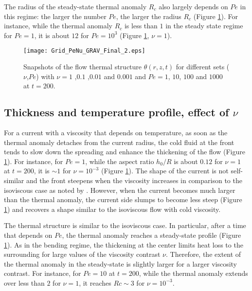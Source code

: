 The  radius of  the steady-state  thermal anomaly  $R_c$ also  largely
depends on $Pe$ in this regime: the larger the number $Pe$, the larger
the  radius  $R_c$  (Figure \ref{C3-Grid_PeNu_GRAV}).   For  instance,
while the thermal  anomaly $R_c$ is less than $1$  in the steady state
regime  for   $Pe=1$,  it   is  about   $12$  for   $Pe=10^3$  (Figure
\ref{C3-Grid_PeNu_GRAV}, $\nu=1$).

\begin{figure}[h!]
  \begin{center}
    \graphicspath{ {/Users/thorey/Documents/These/Projet/Refroidissement/Skin_Model/Figure/JFM_V13/} }
    \texttt{[image: Grid\_PeNu\_GRAV\_Final\_2.eps]}
    \caption{Snapshots of  the flow thermal  structure $\theta(r,z,t)$
      for different sets ($\nu$,$Pe$) with $\nu= 1$ ,$0.1$ ,$0.01$ and
      $0.001$ and $Pe=1$, $10$, $100$ and $1000$ at $t=200$.}
    \label{C3-Grid_PeNu_GRAV}
  \end{center}
\end{figure}

\subsection{Thickness and temperature profile, effect of $\nu$}
\label{C3-sec:thickn-temp-prof}

For a current with a viscosity that depends on temperature, as soon as
the thermal anomaly  detaches from the current radius,  the cold fluid
at  the  front tends  to  slow  down  the  spreading and  enhance  the
thickening   of  the   flow  (Figure   \ref{C3-Grid_PeNu_GRAV}).   For
instance, for $Pe=1$,  while the aspect ratio $h_0/R$  is about $0.12$
for  $\nu=1$ at  $t=200$, it  is  $\sim 1$  for $\nu=10^{-3}$  (Figure
\ref{C3-Grid_PeNu_GRAV}).    The  shape   of   the   current  is   not
self-similar and  the front steepens  when the viscosity  increases in
comparison     to    the     isoviscous    case     as    noted     by
\citet{Bercovici:2007vc}.   However,  when  the current  becomes  much
larger than  the thermal  anomaly, the current  side slumps  to become
less  steep  (Figure  \ref{C3-Grid_PeNu_GRAV}) and  recovers  a  shape
similar to the isoviscous flow with cold viscosity.

The  thermal  structure  is  similar   to  the  isoviscous  case.   In
particular, after  a time  that depends on  $Pe$, the  thermal anomaly
reaches a  steady-state profile (Figure  \ref{C3-Grid_PeNu_GRAV}).  As
in the bending  regime, the thickening at the center  limits heat loss
to the surrounding  for large values of the  viscosity contrast $\nu$.
Therefore, the  extent of the  thermal anomaly in the  steady-state is
slightly larger  for a larger  viscosity contrast.  For  instance, for
$Pe=10$ at $t=200$,  while the thermal anomaly extends  over less than
$2$ for $\nu=1$, it reaches $Rc\sim3$ for $\nu=10^{-3}$.

